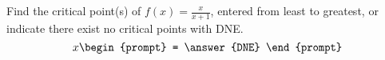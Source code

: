 \documentclass{ximera}
\author{Gregory Hartman \and Matthew Carr}
\begin{document}
\begin{exercise}






Find the critical point(s) of $f(x)=\frac{x}{x+1}$, entered from least to greatest, or indicate there exist no critical points with DNE.
\[
x
\begin{prompt}
= \answer{DNE}
\end{prompt}
\]

\end{exercise}
\end{document}
